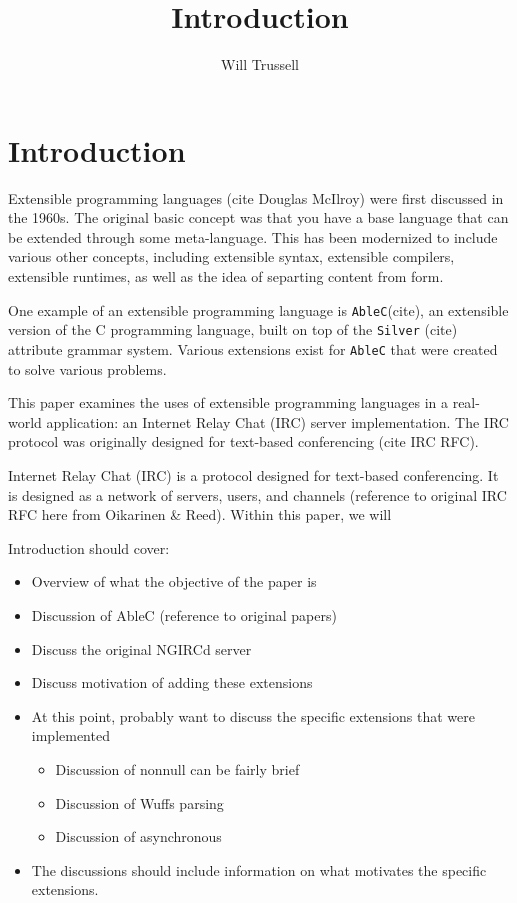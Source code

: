 \documentclass[main.tex]{subfiles}
\author{Will Trussell}
\title{Introduction}
\begin{document}
\section*{Introduction}

Extensible programming languages (cite Douglas McIlroy) were first discussed in
the 1960s. The original basic concept was that you have a base language that can
be extended through some meta-language. This has been modernized to include 
various other concepts, including extensible syntax, extensible compilers, 
extensible runtimes, as well as the idea of separting content from form.

One example of an extensible programming language is \verb|AbleC|(cite), an 
extensible version of the C programming language, built on top of the 
\verb|Silver| (cite) attribute grammar system. Various extensions exist for 
\verb|AbleC| that were created to solve various problems.

This paper examines the uses of extensible programming languages in a real-world
application: an Internet Relay Chat (IRC) server implementation. The IRC
protocol was originally designed for text-based conferencing (cite IRC RFC).

Internet Relay Chat (IRC) is a protocol designed for text-based conferencing. It
is designed as a network of servers, users, and channels (reference to original
IRC RFC here from Oikarinen \& Reed). Within this paper, we will

Introduction should cover:
\begin{itemize}
    \item Overview of what the objective of the paper is
    \item Discussion of AbleC (reference to original papers)
    \item Discuss the original NGIRCd server
    \item Discuss motivation of adding these extensions
    \item At this point, probably want to discuss the specific extensions that 
        were implemented
        \begin{itemize}
            \item Discussion of nonnull can be fairly brief
            \item Discussion of Wuffs parsing
            \item Discussion of asynchronous
        \end{itemize}
    \item The discussions should include information on what motivates the 
        specific extensions.
\end{itemize}
\end{document}
